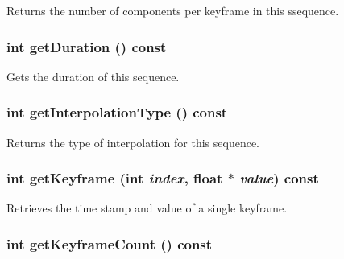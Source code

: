 Returns the number of components per keyframe in this ssequence. \hypertarget{classm3g_1_1KeyframeSequence_995a5ca5c8c3c993ef167f67cbb5fabe}{
\subsubsection[{getDuration}]{\setlength{\rightskip}{0pt plus 5cm}int getDuration () const}}
\label{classm3g_1_1KeyframeSequence_995a5ca5c8c3c993ef167f67cbb5fabe}


Gets the duration of this sequence. \hypertarget{classm3g_1_1KeyframeSequence_0d46321e7f46e037508cce88cdf6a487}{
\subsubsection[{getInterpolationType}]{\setlength{\rightskip}{0pt plus 5cm}int getInterpolationType () const}}
\label{classm3g_1_1KeyframeSequence_0d46321e7f46e037508cce88cdf6a487}


Returns the type of interpolation for this sequence. \hypertarget{classm3g_1_1KeyframeSequence_0fd27047149eedab8b10319768e1fe9a}{
\subsubsection[{getKeyframe}]{\setlength{\rightskip}{0pt plus 5cm}int getKeyframe (int {\em index}, \/  float $\ast$ {\em value}) const}}
\label{classm3g_1_1KeyframeSequence_0fd27047149eedab8b10319768e1fe9a}


Retrieves the time stamp and value of a single keyframe. \hypertarget{classm3g_1_1KeyframeSequence_4d500a603f25adafd8e6f8b68872dbff}{
\subsubsection[{getKeyframeCount}]{\setlength{\rightskip}{0pt plus 5cm}int getKeyframeCount () const}}
\label{classm3g_1_1KeyframeSequence_4d500a603f25adafd8e6f8b68872dbff}


